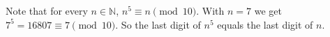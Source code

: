 Note that for every $n \in \mathbb{N}$, $n^{5} \equiv n \pmod{10}$.
With $n = 7$ we get $7^{5} = 16807 \equiv 7 \pmod{10}$.
So the last digit of $n^{5}$ equals the last digit of $n$.